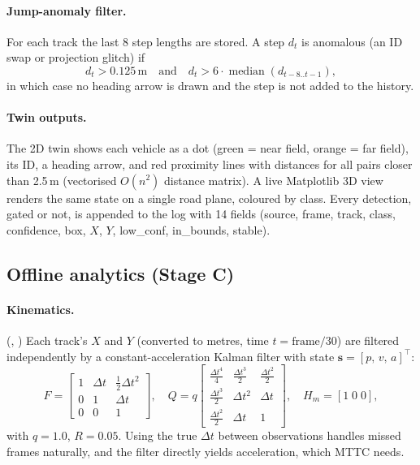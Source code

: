 \documentclass[11pt,a4paper]{article}
\DeclareRobustCommand{\file}[1]{\texttt{\detokenize{#1}}}
\begin{document}
\paragraph{Jump-anomaly filter.} For each track the last 8 step lengths are stored. A step $d_t$ is anomalous (an ID swap or
projection glitch) if
\begin{equation}
  d_t > 0.125\,\text{m} \quad\text{and}\quad d_t > 6 \cdot \operatorname{median}(d_{t-8..t-1}),
\end{equation}
in which case no heading arrow is drawn and the step is not added to the history.

\paragraph{Twin outputs.} The 2D twin shows each vehicle as a dot (green = near field, orange = far field), its ID, a heading
arrow, and red proximity lines with distances for all pairs closer than 2.5\,m (vectorised $O(n^2)$ distance matrix). A live
Matplotlib 3D view renders the same state on a single road plane, coloured by class. Every detection, gated or not, is appended
to the log with 14 fields (source, frame, track, class, confidence, box, $X$, $Y$, low\_conf, in\_bounds, stable).

\subsection{Offline analytics (Stage C)}
\paragraph{Kinematics.} (\file{kalman.py}, \file{motion.py}) Each track's $X$ and $Y$ (converted to metres, time $t=\text{frame}/30$)
are filtered independently by a constant-acceleration Kalman filter with state $\mathbf{s}=[p,\,v,\,a]^\top$:
\begin{equation}
F=\begin{bmatrix}1&\Delta t&\tfrac12\Delta t^2\\0&1&\Delta t\\0&0&1\end{bmatrix},\quad
Q=q\begin{bmatrix}\tfrac{\Delta t^4}{4}&\tfrac{\Delta t^3}{2}&\tfrac{\Delta t^2}{2}\\ \tfrac{\Delta t^3}{2}&\Delta t^2&\Delta t\\ \tfrac{\Delta t^2}{2}&\Delta t&1\end{bmatrix},\quad
H_{\!m}=[1\;0\;0],
\end{equation}
with $q=1.0$, $R=0.05$. Using the true $\Delta t$ between observations handles missed frames naturally, and the filter directly
yields acceleration, which MTTC needs.
\end{document}
